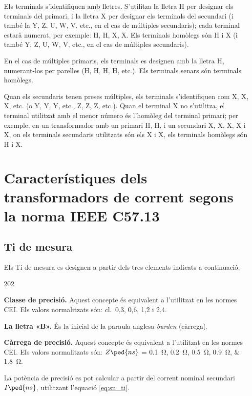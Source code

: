 Els terminals s'identifiquen amb lletres. S'utilitza la lletra H per designar els terminals del primari, i la lletra X per designar els terminals del secundari (i també la Y, Z, U, W, V,  etc.{}, en el cas de múltiples secundaris); cada terminal estarà numerat, per exemple: H, H,  X, X. Els terminals homòlegs són H i X (i també Y, Z, U, W, V, etc.{}, en el cas de múltiples secundaris).

En el cas de múltiples primaris, els terminals es designen amb la lletra H, numerant-los per parelles (H, H, H, H, etc.{}). Els terminals senars són terminals homòlegs.

Quan els secundaris tenen preses múltiples, els terminals s'identifiquen com X, X, X, etc.{} (o Y, Y, Y, etc.{}, Z, Z, Z, etc.{}). Quan el terminal X no s'utilitza, el terminal utilitzat amb el menor número és l'homòleg del terminal primari; per exemple, en un transformador amb un primari H, H, i un secundari  X, X, X, X i X, on els terminals secundaris utilitzats són els X i  X, els terminals homòlegs són H i X.


\section{Característiques dels transformadors de corrent segons la norma IEEE C57.13}


\subsection{Ti de mesura}

Els Ti de mesura  es designen a partir
dels tres elements indicats a continuació.

\begin{dingautolist}{202}
    \item \textbf{Classe de precisió.} Aquest concepte és equivalent
    a l'utilitzat en les normes CEI. Els valors
    normalitzats són: cl.~0,3, 0,6, 1,2 i 2,4.
    \item \textbf{La lletra «B».} És la inicial de la paraula anglesa
    \textit{burden}  (càrrega).
    \item \textbf{Càrrega de precisió.} Aquest concepte és equivalent
    a l'utilitzat en les normes CEI. Els valors
    normalitzats són: $Z\ped{ns}$ = \qtylist{0,1;0,2;0,5;0,9;1,8}{\ohm}.

    La potència de precisió es pot calcular a partir del
    corrent  nominal secundari $I\ped{ns}$, utilitzant l'equació
    \eqref{eq:sn_ti}.
\end{dingautolist}


